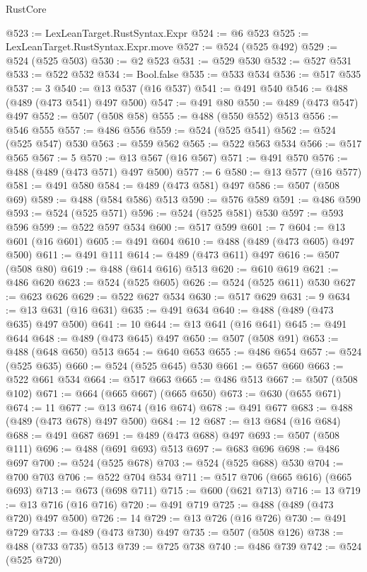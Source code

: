 \begin{lexlean}{RustCore}
\begin{coremodule}
@523 := LexLeanTarget.RustSyntax.Expr
@524 := @6 @523
@525 := LexLeanTarget.RustSyntax.Expr.move
@527 := @524 (@525 @492)
@529 := @524 (@525 @503)
@530 := @2 @523
@531 := @529 @530
@532 := @527 @531
@533 := @522 @532
@534 := Bool.false
@535 := @533 @534
@536 := @517 @535
@537 := 3
@540 := @13 @537 (@16 @537)
@541 := @491 @540
@546 := @488 (@489 (@473 @541) @497 @500)
@547 := @491 @80
@550 := @489 (@473 @547) @497
@552 := @507 (@508 @58)
@555 := @488 (@550 @552) @513
@556 := @546 @555
@557 := @486 @556
@559 := @524 (@525 @541)
@562 := @524 (@525 @547) @530
@563 := @559 @562
@565 := @522 @563 @534
@566 := @517 @565
@567 := 5
@570 := @13 @567 (@16 @567)
@571 := @491 @570
@576 := @488 (@489 (@473 @571) @497 @500)
@577 := 6
@580 := @13 @577 (@16 @577)
@581 := @491 @580
@584 := @489 (@473 @581) @497
@586 := @507 (@508 @69)
@589 := @488 (@584 @586) @513
@590 := @576 @589
@591 := @486 @590
@593 := @524 (@525 @571)
@596 := @524 (@525 @581) @530
@597 := @593 @596
@599 := @522 @597 @534
@600 := @517 @599
@601 := 7
@604 := @13 @601 (@16 @601)
@605 := @491 @604
@610 := @488 (@489 (@473 @605) @497 @500)
@611 := @491 @111
@614 := @489 (@473 @611) @497
@616 := @507 (@508 @80)
@619 := @488 (@614 @616) @513
@620 := @610 @619
@621 := @486 @620
@623 := @524 (@525 @605)
@626 := @524 (@525 @611) @530
@627 := @623 @626
@629 := @522 @627 @534
@630 := @517 @629
@631 := 9
@634 := @13 @631 (@16 @631)
@635 := @491 @634
@640 := @488 (@489 (@473 @635) @497 @500)
@641 := 10
@644 := @13 @641 (@16 @641)
@645 := @491 @644
@648 := @489 (@473 @645) @497
@650 := @507 (@508 @91)
@653 := @488 (@648 @650) @513
@654 := @640 @653
@655 := @486 @654
@657 := @524 (@525 @635)
@660 := @524 (@525 @645) @530
@661 := @657 @660
@663 := @522 @661 @534
@664 := @517 @663
@665 := @486 @513
@667 := @507 (@508 @102)
@671 := @664 (@665 @667) (@665 @650)
@673 := @630 (@655 @671)
@674 := 11
@677 := @13 @674 (@16 @674)
@678 := @491 @677
@683 := @488 (@489 (@473 @678) @497 @500)
@684 := 12
@687 := @13 @684 (@16 @684)
@688 := @491 @687
@691 := @489 (@473 @688) @497
@693 := @507 (@508 @111)
@696 := @488 (@691 @693) @513
@697 := @683 @696
@698 := @486 @697
@700 := @524 (@525 @678)
@703 := @524 (@525 @688) @530
@704 := @700 @703
@706 := @522 @704 @534
@711 := @517 @706 (@665 @616) (@665 @693)
@713 := @673 (@698 @711)
@715 := @600 (@621 @713)
@716 := 13
@719 := @13 @716 (@16 @716)
@720 := @491 @719
@725 := @488 (@489 (@473 @720) @497 @500)
@726 := 14
@729 := @13 @726 (@16 @726)
@730 := @491 @729
@733 := @489 (@473 @730) @497
@735 := @507 (@508 @126)
@738 := @488 (@733 @735) @513
@739 := @725 @738
@740 := @486 @739
@742 := @524 (@525 @720)

\end{coremodule}
\end{lexlean}
